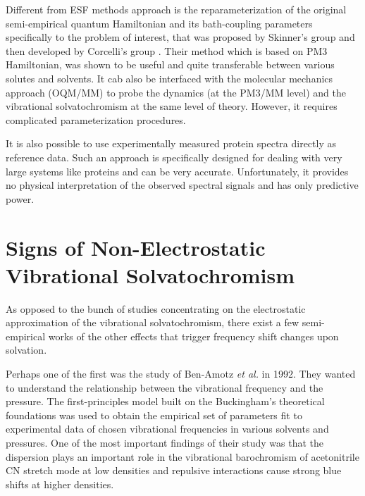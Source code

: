 \documentclass[a4paper,titlepage,twoside,fleqn,12pt]{book}
\begin{document}
\begin{refsection}
Different from ESF methods approach is the reparameterization of the original semi\hyp{}empirical 
quantum Hamiltonian and its bath\hyp{}coupling parameters specifically to the problem of interest,
that was proposed by Skinner's group \citep{Li.Schmidt.Corcelli.Lawrence.Skinner.JCP.2006}
and then developed by Corcelli's group \citep{
Lindquist.Corcelli.JPCB.2008,Lindquist.Haws.Corcelli.JPCB.2008,
Lindquist.Furse.Corcelli.PCCP.2009}. Their method which is based on PM3 Hamiltonian,\citep{Stewart.JCC.1988}
was shown to be useful and quite transferable between various solutes and solvents. 
It cab also be interfaced with the molecular mechanics approach (OQM/MM) \citep{Lindquist.Haws.Corcelli.JPCB.2008}
to probe the dynamics (at the PM3/MM level) and the vibrational solvatochromism 
at the same level of theory.
However, it requires complicated
parameterization procedures.

It is also possible to use experimentally measured protein spectra directly 
as reference data.\citep{Karjalainen.Ersmark.Barth.JPCB.2012}
Such an approach is specifically designed for dealing with very large systems like proteins and
can be very accurate. Unfortunately, it provides no physical interpretation of the observed
spectral signals and has only predictive power.



\section{Signs of Non-Electrostatic Vibrational Solvatochromism}
As opposed to the bunch of studies concentrating on the electrostatic
approximation of the vibrational solvatochromism, there exist a few 
semi\hyp{}empirical works of the other effects that trigger frequency shift
changes upon solvation. 

Perhaps one of the first was the study of Ben-Amotz \emph{et al.} in 1992.\citep{Ben-Amotz.Lee.Cho.List.JCP.1992}
They wanted to understand the relationship between the vibrational frequency
and the pressure. The first\hyp{}principles model built on the Buckingham's theoretical
foundations \citep{Buckingham.ProcRSocLondonA.1958,Buckingham.TransFaradaySoc.1960,
Buckingham.ProcRSocLondonA.1960} was used to obtain the empirical set of parameters fit to
experimental data of chosen vibrational frequencies in various solvents
and pressures. One of the most important findings of their study was
that the dispersion plays an important role in the vibrational barochromism
of acetonitrile CN stretch mode at low densities and repulsive interactions cause strong blue shifts
at higher densities.


\end{refsection}
\end{document}
